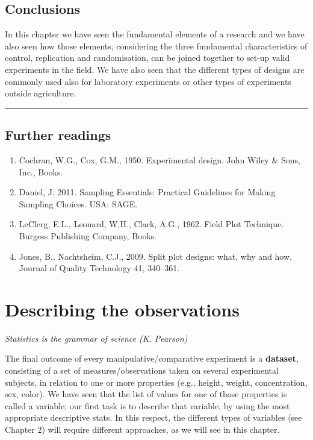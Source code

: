 \documentclass[a4paper,12pt,oneside]{book}
\providecommand{\tightlist}{%
  \setlength{\itemsep}{0pt}\setlength{\parskip}{0pt}}
\begin{document}
\hypertarget{conclusions-1}{%
\section{Conclusions}\label{conclusions-1}}

In this chapter we have seen the fundamental elements of a research and we have also seen how those elements, considering the three fundamental characteristics of control, replication and randomisation, can be joined together to set-up valid experiments in the field. We have also seen that the different types of designs are commonly used also for laboratory experiments or other types of experiments outside agriculture.

\begin{center}\rule{0.5\linewidth}{0.5pt}\end{center}

\hypertarget{further-readings-1}{%
\section{Further readings}\label{further-readings-1}}

\begin{enumerate}
\def\labelenumi{\arabic{enumi}.}
\tightlist
\item
  Cochran, W.G., Cox, G.M., 1950. Experimental design. John Wiley \& Sons, Inc., Books.
\item
  Daniel, J. 2011. Sampling Essentials: Practical Guidelines for Making Sampling Choices. USA: SAGE.
\item
  LeClerg, E.L., Leonard, W.H., Clark, A.G., 1962. Field Plot Technique. Burgess Publishing Company, Books.
\item
  Jones, B., Nachtsheim, C.J., 2009. Split plot designs: what, why and how. Journal of Quality Technology 41, 340--361.
\end{enumerate}

\hypertarget{describing-the-observations}{%
\chapter{Describing the observations}\label{describing-the-observations}}

\emph{Statistics is the grammar of science (K. Pearson)}

The final outcome of every manipulative/comparative experiment is a \textbf{dataset}, consisting of a set of measures/observations taken on several experimental subjects, in relation to one or more properties (e.g., height, weight, concentration, sex, color). We have seen that the list of values for one of those properties is called a variable; our first task is to describe that variable, by using the most appropriate descriptive stats. In this respect, the different types of variables (see Chapter 2) will require different approaches, as we will see in this chapter.
\end{document}
